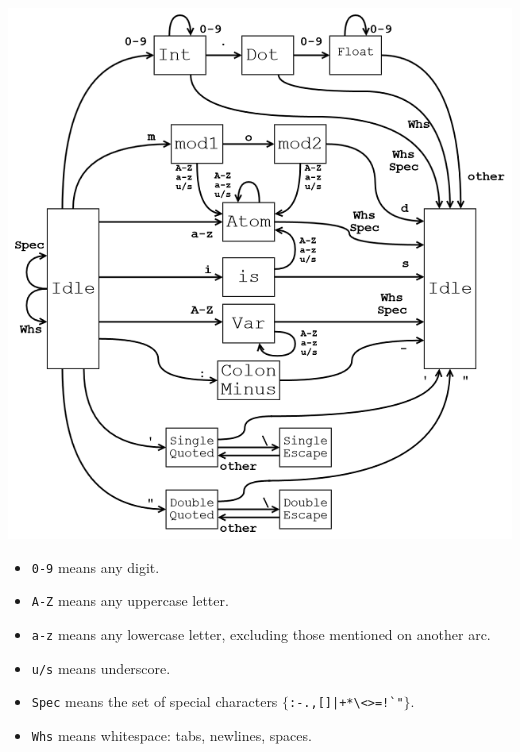 \documentclass[12pt]{article}
\begin{document}
\vspace{-50px}
\includegraphics{lex65.png}%

\vspace{-10px}
\begin{itemize}
\item \verb|0-9| means any digit.\vspace{-4px}
\item \verb|A-Z| means any uppercase letter.\vspace{-4px}
\item \verb|a-z| means any lowercase letter, excluding those mentioned on another arc.\vspace{-4px}
\item \verb|u/s| means underscore.\vspace{-4px}
\item \verb|Spec| means the set of special characters $\{$\verb/:-.,[]|+*\<>=!`"/$\}$.\vspace{-4px}
\item \verb|Whs| means whitespace: tabs, newlines, spaces.
\end{itemize}

\newpage
\end{document}
